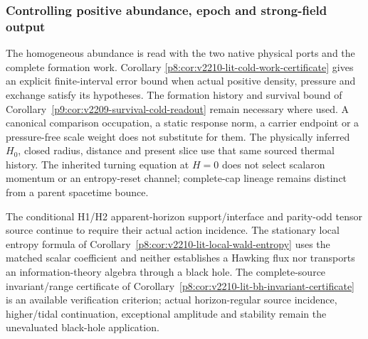 \documentclass[12pt,a4paper]{article}
\begin{document}
\subsubsection{Controlling positive abundance, epoch and strong-field output}
The homogeneous abundance is read with the two native physical ports and
the complete formation work. Corollary
\ref{p8:cor:v2210-lit-cold-work-certificate} gives an explicit finite-interval
error bound when actual positive density, pressure and exchange satisfy
its hypotheses. The formation history and survival bound of
Corollary~\ref{p9:cor:v2209-survival-cold-readout} remain necessary where
used. A canonical comparison occupation, a static response norm, a carrier
endpoint or a pressure-free scale weight does not substitute for them.
The physically inferred $H_0$, closed radius, distance and present slice
use that same sourced thermal history. The inherited turning equation at
$H=0$ does not select scalaron momentum or an entropy-reset channel;
complete-cap lineage remains distinct from a parent spacetime bounce.

The conditional H1/H2 apparent-horizon support/interface and parity-odd
tensor source continue to require their actual action incidence. The
stationary local entropy formula of
Corollary~\ref{p8:cor:v2210-lit-local-wald-entropy} uses the matched scalar
coefficient and neither establishes a Hawking flux nor transports an
information-theory algebra through a black hole. The complete-source
invariant/range certificate of
Corollary~\ref{p8:cor:v2210-lit-bh-invariant-certificate} is an available
verification criterion; actual horizon-regular source incidence,
higher/tidal continuation, exceptional amplitude and stability remain
the unevaluated black-hole application.

\end{document}
